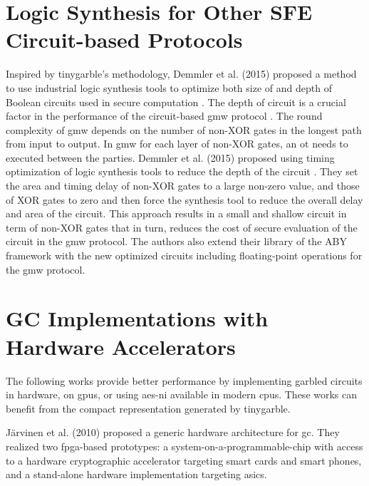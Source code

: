 \section{Logic Synthesis for Other SFE Circuit-based Protocols} \label{sec:related-logic}
Inspired by \gls{tinygarble}'s methodology, Demmler et al. (2015) proposed a method to use industrial logic synthesis tools to optimize both size of and depth of Boolean circuits used in secure computation \cite{demmler2015automated}.
The depth of circuit is a crucial factor in the performance of the circuit-based \acrfull{gmw} protocol \cite{goldreich1987play}.
The round complexity of \acrshort{gmw} depends on the number of non-XOR gates in the longest path from input to output.
In \acrshort{gmw} for each layer of non-XOR gates, an \acrshort{ot} needs to executed between the parties.
Demmler et al. (2015) proposed using timing optimization of logic synthesis tools to reduce the depth of the circuit \cite{demmler2015automated}.
They set the area and timing delay of non-XOR gates to a large non-zero value, and those of XOR gates to zero and then force the synthesis tool to reduce the overall delay and area of the circuit.
This approach results in a small and shallow circuit in term of non-XOR gates that in turn, reduces the cost of secure evaluation of the circuit in the \acrshort{gmw} protocol.
The authors also extend their library of the ABY framework \cite{demmler2015aby} with the new optimized circuits including floating-point operations for the \acrshort{gmw} protocol.

\section{GC Implementations with Hardware Accelerators} \label{sec:related-hardware}
The following works provide better performance by implementing garbled circuits in hardware, on \acrshort{gpu}s, or using \acrshort{aes-ni} available in modern \acrshort{cpu}s.
These works can benefit from the compact representation generated by \gls{tinygarble}.

J\"arvinen et al. (2010) \cite{jarvinen2010garbled} proposed a generic hardware architecture for \acrshort{gc}.
They realized two \acrshort{fpga}-based prototypes: a system-on-a-programmable-chip with access to a hardware cryptographic accelerator targeting smart cards and smart phones, and a stand-alone hardware implementation targeting \acrshort{asic}s.


